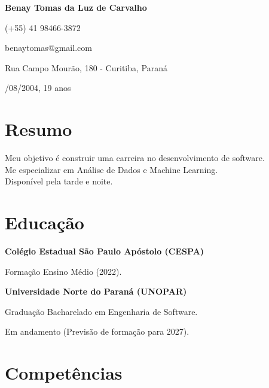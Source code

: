 \documentclass{article}
\newcommand{\cvsection}[1]{\section*{\rmfamily#1}}
\begin{document}
\selectfont

\begin{center}
    \Huge{
    \rmfamily
    \textbf{Benay Tomas da Luz de Carvalho}}
\end{center}
\vspace{5pt}


\setlength{\parskip}{1pt}
\renewcommand{\arraystretch}{1.25}


\begin{center}

{\large

\noindent (+55) 41 98466-3872

\noindent benaytomas@gmail.com

\noindent Rua Campo Mourão, 180 - Curitiba, Paraná

/08/2004, 19 anos

}

\end{center}

\setlength{\parskip}{3pt}

\cvsection{Resumo}

\indent
{\large

Meu objetivo é construir uma carreira no desenvolvimento de software.\\
\indent Me especializar em Análise de Dados e Machine Learning.\\
\indent Disponível pela tarde e noite.

}

\cvsection{Educação}
\indent 
{\large

\textbf{Colégio Estadual São Paulo Apóstolo (CESPA)}

\hspace{2em}Formação Ensino Médio (2022).

\textbf{Universidade Norte do Paraná (UNOPAR)}

\hspace{2em}Graduação Bacharelado em Engenharia de Software.

\hspace{2em}Em andamento (Previsão de formação para 2027).
}

\vspace*{.15cm}
\cvsection{Competências}
\noindent
\end{document}
